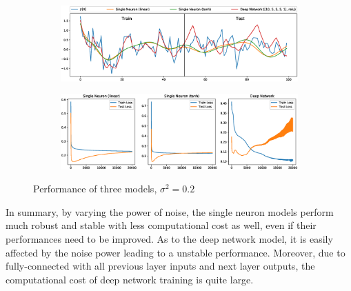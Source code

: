 \begin{figure}[H]
     \centering
     \begin{subfigure}[b]{0.6\textwidth}
         \centering
         \includegraphics[width=\textwidth]{fig/4/48c1.eps}
     \end{subfigure}
     \begin{subfigure}[b]{0.7\textwidth}
         \centering
         \includegraphics[width=\textwidth]{fig/4/48c2.eps}
     \end{subfigure}
     \caption{Performance of three models, $\sigma^2=0.2$}
     \label{fig:4_8_c}
\end{figure}
\noindent
In summary, by varying the power of noise, the single neuron models perform much robust and stable with less computational cost as well, even if their performances need to be improved. As to the deep network model, it is easily affected by the noise power leading to a unstable performance. Moreover, due to fully-connected with all previous layer inputs and next layer outputs, the computational cost of deep network training is quite large.
